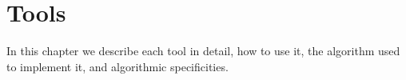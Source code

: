 \chapter{Tools}

In this chapter we describe each tool in detail, how to use it, the
algorithm used to implement it, and algorithmic specificities.



































